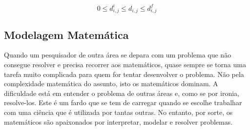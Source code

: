 \documentclass[a4paper,12pt]{article}
\begin{document}
	$$ 0 \leq d_{i,j}^i \leq d_{i,j} \leq d_{i,j}^f$$
	
	\subsection{Modelagem Matemática}
	Quando um pesquisador de outra área se depara com um problema que não consegue resolver e precisa recorrer aos matemáticos, quase sempre se torna uma tarefa muito complicada para quem for tentar desenvolver o problema. Não pela complexidade matemática do assunto, isto os matemáticos dominam. A dificuldade está em entender o problema de outras áreas e, como se por ironia, resolve-los. Este é um fardo que se tem de carregar quando se escolhe trabalhar com uma ciência que é utilizada por tantas outras. No entanto, por sorte, os matemáticos são apaixonados por interpretar, modelar e resolver problemas.
	
\end{document}
